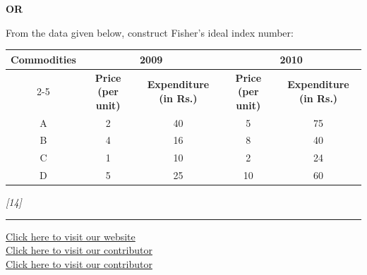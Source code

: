 \documentclass[11pt,a4paper]{article}
\newcommand{\pts}[1]{\hfill   \textit{[#1]}}
\begin{document}
\centerline{   \textbf{OR}}

From the data given below, construct Fisher's ideal index number:


\begin{center}
\small

\begin{tabular}{|c|c|c||c|c|}
\hline
   \textbf{Commodities} & \multicolumn{2}{c||}{   \textbf{2009}} & \multicolumn{2}{c|}{   \textbf{2010}} \\
\cline{2-5}
 &   \textbf{Price (per unit)} &   \textbf{Expenditure (in Rs.)} &   \textbf{Price (per unit)} &   \textbf{Expenditure (in Rs.)} \\
\hline
A & 2 & 40 & 5 & 75 \\
B & 4 & 16 & 8 & 40 \\
C & 1 & 10 & 2 & 24 \\
D & 5 & 25 & 10 & 60 \\
\hline
\end{tabular}
\end{center}\pts{14}

\vfill
\rule{\linewidth}{0.4pt}

\begin{center}\small
\href{https://bhu-exam.vercel.app/}{Click here to visit our website}\\[4pt]
\href{https://me-aryan.vercel.app/}{Click here to visit our contributor}\\[4pt]
\href{https://quashan-me.vercel.app/}{Click here to visit our contributor}
\end{center}
\end{document}
